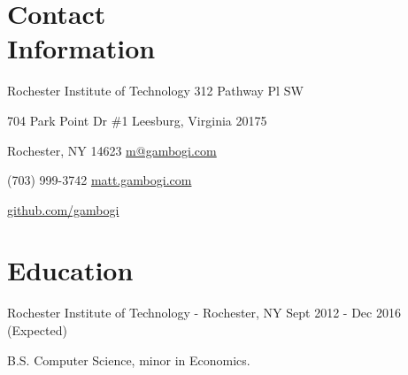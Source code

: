 \documentclass[letter,margin,line]{resume}
\newcommand{\rdate}[1]{\hfill {\small #1}}
\begin{document}
\begin{resume}
\section{\mysidestyle Contact \\ Information} \vspace{2mm}
\begin{asparablank}
\item Rochester Institute of Technology \hfill 312 Pathway Pl SW
\item 704 Park Point Dr \#1 \hfill Leesburg, Virginia 20175
\item Rochester, NY 14623 \hfill
\href{mailto:m@gambogi.com}{m@gambogi.com}
\item (703) 999-3742 \hfill \href{http://matt.gambogi.com}{matt.gambogi.com}
\item \hfill \href{http://github.com/gambogi}{github.com/gambogi}
\end{asparablank}

\section{\mysidestyle Education}
\begin{compactdesc}
\item[Rochester Institute of Technology] - Rochester, NY 
\rdate{Sept 2012 - Dec 2016 (Expected)}
\item B.S. Computer Science, minor in Economics.
\end{compactdesc}


\end{resume}
\end{document}
